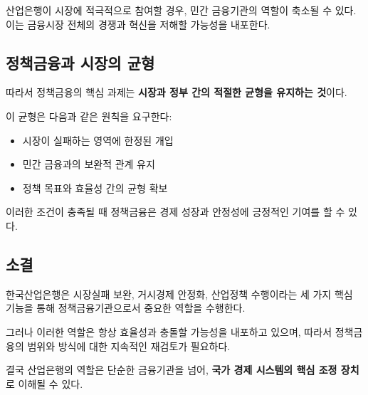 산업은행이 시장에 적극적으로 참여할 경우, 민간 금융기관의 역할이 축소될 수 있다.  
이는 금융시장 전체의 경쟁과 혁신을 저해할 가능성을 내포한다.

\subsection{정책금융과 시장의 균형}

따라서 정책금융의 핵심 과제는 \textbf{시장과 정부 간의 적절한 균형을 유지하는 것}이다.

이 균형은 다음과 같은 원칙을 요구한다:

\begin{itemize}
    \item 시장이 실패하는 영역에 한정된 개입
    \item 민간 금융과의 보완적 관계 유지
    \item 정책 목표와 효율성 간의 균형 확보
\end{itemize}

이러한 조건이 충족될 때 정책금융은 경제 성장과 안정성에 긍정적인 기여를 할 수 있다.

\subsection{소결}

한국산업은행은 시장실패 보완, 거시경제 안정화, 산업정책 수행이라는 세 가지 핵심 기능을 통해 정책금융기관으로서 중요한 역할을 수행한다.

그러나 이러한 역할은 항상 효율성과 충돌할 가능성을 내포하고 있으며, 따라서 정책금융의 범위와 방식에 대한 지속적인 재검토가 필요하다.

결국 산업은행의 역할은 단순한 금융기관을 넘어, \textbf{국가 경제 시스템의 핵심 조정 장치}로 이해될 수 있다.